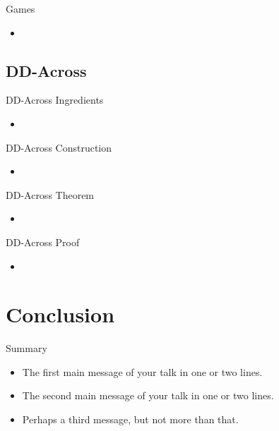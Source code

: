 \documentclass{beamer}
\begin{document}
\begin{frame}{Games}
	\begin{itemize}
		\setlength\itemsep{1em}
		\item 
	\end{itemize}
\end{frame}

\subsection{DD-Across}

\begin{frame}{DD-Across Ingredients}
	\begin{itemize}
		\setlength\itemsep{1em}
		\item 
	\end{itemize}
\end{frame}

\begin{frame}{DD-Across Construction}
	\begin{itemize}
		\setlength\itemsep{1em}
		\item 
	\end{itemize}
\end{frame}

\begin{frame}{DD-Across Theorem}
	\begin{itemize}
		\setlength\itemsep{1em}
		\item 
	\end{itemize}
\end{frame}

\begin{frame}{DD-Across Proof}
	\begin{itemize}
		\setlength\itemsep{1em}
		\item 
	\end{itemize}
\end{frame}

\section{Conclusion}
\begin{frame}{Summary}
	\begin{itemize}
		\setlength\itemsep{1em}
		\item
    The \alert{first main message} of your talk in one or two lines.
  \item
    The \alert{second main message} of your talk in one or two lines.
  \item
    Perhaps a \alert{third message}, but not more than that.
	\end{itemize}
\end{frame}
\end{document}
